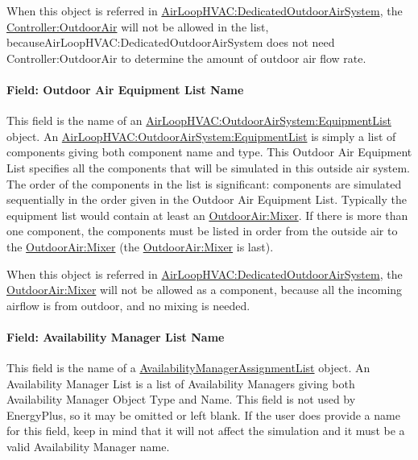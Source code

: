 When this object is referred in \hyperref[airloophvacdedicatedoutdoorairsystem]{AirLoopHVAC:DedicatedOutdoorAirSystem}, the \hyperref[controlleroutdoorair]{Controller:OutdoorAir} will not be allowed in the list, becauseAirLoopHVAC:DedicatedOutdoorAirSystem does not need Controller:OutdoorAir to determine the amount of outdoor air flow rate.

\paragraph{Field: Outdoor Air Equipment List Name}\label{field-outdoor-air-equipment-list-name}

This field is the name of an \hyperref[airloophvacoutdoorairsystemequipmentlist]{AirLoopHVAC:OutdoorAirSystem:EquipmentList} object. An \hyperref[airloophvacoutdoorairsystemequipmentlist]{AirLoopHVAC:OutdoorAirSystem:EquipmentList} is simply a list of components giving both component name and type. This Outdoor Air Equipment List specifies all the components that will be simulated in this outside air system. The order of the components in the list is significant: components are simulated sequentially in the order given in the Outdoor Air Equipment List. Typically the equipment list would contain at least an \hyperref[outdoorairmixer]{OutdoorAir:Mixer}. If there is more than one component, the components must be listed in order from the outside air to the \hyperref[outdoorairmixer]{OutdoorAir:Mixer} (the \hyperref[outdoorairmixer]{OutdoorAir:Mixer} is last).

When this object is referred in \hyperref[airloophvacdedicatedoutdoorairsystem]{AirLoopHVAC:DedicatedOutdoorAirSystem}, the \hyperref[outdoorairmixer]{OutdoorAir:Mixer} will not be allowed as a component, because all the incoming airflow is from outdoor, and no mixing is needed.

\paragraph{Field: Availability Manager List Name}\label{field-availability-manager-list-name-1}

This field is the name of a \hyperref[availabilitymanagerassignmentlist]{AvailabilityManagerAssignmentList} object. An Availability Manager List is a list of Availability Managers giving both Availability Manager Object Type and Name.  This field is not used by EnergyPlus, so it may be omitted or left blank.  If the user does provide a name for this field, keep in mind that it will not affect the simulation and it must be a valid Availability Manager name.

